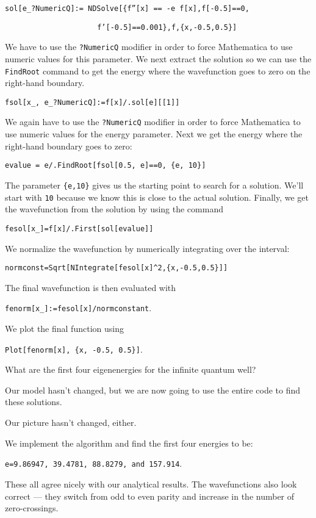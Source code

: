 \texttt{sol[e\_?NumericQ]:= NDSolve[\{f''[x] == -e f[x],f[-0.5]==0, }

\texttt{$\phantom{dsfsdfgsdfgsdfgggdgdfg}$f'[-0.5]==0.001\},f,\{x,-0.5,0.5\}]}

We have to use the \texttt{?NumericQ} modifier in order to force Mathematica to use numeric values for this parameter. We next extract the solution so we can use the \texttt{FindRoot} command to get the energy where the wavefunction goes to zero on the right-hand boundary.

\texttt{fsol[x\_, e\_?NumericQ]:=f[x]/.sol[e][[1]]}

We again have to use the \texttt{?NumericQ} modifier in order to force Mathematica to use numeric values for the energy parameter. Next we get the energy where the right-hand boundary goes to zero:

\texttt{evalue = e/.FindRoot[fsol[0.5, e]==0, \{e, 10\}]}

The parameter \texttt{\{e,10\}} gives us the starting point to search for a solution. We'll start with \texttt{10} because we know this is close to the actual solution. Finally, we get the wavefunction from the solution by using the command

\texttt{fesol[x\_]=f[x]/.First[sol[evalue]]}

We normalize the wavefunction by numerically integrating over the interval:

\texttt{normconst=Sqrt[NIntegrate[fesol[x]\^{}2,\{x,-0.5,0.5\}]]}

The final wavefunction is then evaluated with

\texttt{fenorm[x\_]:=fesol[x]/normconstant}.

We plot the final function using 

\texttt{Plot[fenorm[x], \{x, -0.5, 0.5\}]}.

\begin{example}
What are the first four eigenenergies for the infinite quantum well?

\model Our model hasn't changed, but we are now going to use the entire code to find these solutions.

\vis Our picture hasn't changed, either.

\sol We implement the algorithm and find the first four energies to be:

\texttt{e=9.86947, 39.4781, 88.8279, and 157.914}.

\assess These all agree nicely with our analytical results. The wavefunctions also look correct --- they switch from odd to even parity and increase in the number of zero-crossings.

\end{example}

